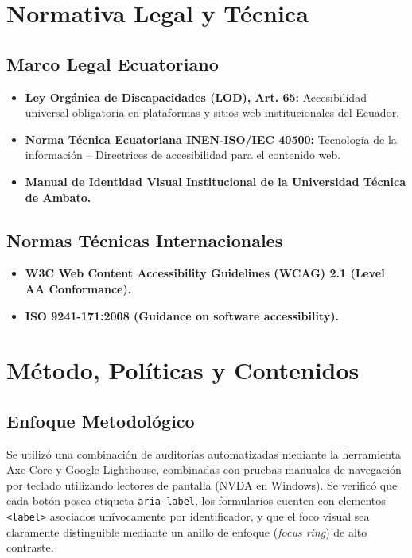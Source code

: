 \documentclass[12pt,a4paper]{article}
\begin{document}
\section{Normativa Legal y Técnica}
\subsection{Marco Legal Ecuatoriano}
\begin{itemize}[leftmargin=1.5em, itemsep=2pt]
    \item \textbf{Ley Orgánica de Discapacidades (LOD), Art. 65:} Accesibilidad universal obligatoria en plataformas y sitios web institucionales del Ecuador.
    \item \textbf{Norma Técnica Ecuatoriana INEN-ISO/IEC 40500:} Tecnología de la información -- Directrices de accesibilidad para el contenido web.
    \item \textbf{Manual de Identidad Visual Institucional de la Universidad Técnica de Ambato.}
\end{itemize}
\subsection{Normas Técnicas Internacionales}
\begin{itemize}[leftmargin=1.5em, itemsep=2pt]
    \item \textbf{W3C Web Content Accessibility Guidelines (WCAG) 2.1 (Level AA Conformance).}
    \item \textbf{ISO 9241-171:2008 (Guidance on software accessibility).}
\end{itemize}

\section{Método, Políticas y Contenidos}
\subsection{Enfoque Metodológico}
Se utilizó una combinación de auditorías automatizadas mediante la herramienta Axe-Core y Google Lighthouse, combinadas con pruebas manuales de navegación por teclado utilizando lectores de pantalla (NVDA en Windows). Se verificó que cada botón posea etiqueta \texttt{aria-label}, los formularios cuenten con elementos \texttt{<label>} asociados unívocamente por identificador, y que el foco visual sea claramente distinguible mediante un anillo de enfoque (\textit{focus ring}) de alto contraste.
\end{document}
